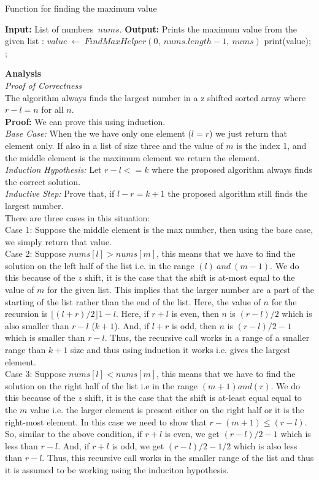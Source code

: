 \documentclass{article}
\begin{document}
\begin{algorithm}
\caption{Function for finding the maximum value}
\label{alg:maxfind}
\begin{algorithmic}[1]
\State \textbf{Input:} List of numbers\ $nums$.
\State \textbf{Output:} Prints the maximum value from the given list
:
\State $value\ \leftarrow\ FindMaxHelper(0,\ nums.length-1,\ nums)$
\State print(value);
\State \Return;
\EndFunction
\end{algorithmic}
\end{algorithm}

\textbf{Analysis}\\
\textit{Proof of Correctness}\\
The algorithm always finds the largest number in a z shifted sorted array where $r-l=n$ for all $n$.\\
\textbf{Proof:} We can prove this using induction. \\
\textit{Base Case: } When the we have only one element ($l=r$) we just return that element only. If also in a list of size three and the value of $m$ is the index 1, and the middle element is the maximum element we return the element. \\
\textit{Induction Hypothesis: } Let $r-l<=k$ where the proposed algorithm always finds the correct solution.\\
\textit{Inductive Step: } Prove that, if $l-r=k+1$ the proposed algorithm still finds the largest number. \\
There are three cases in this situation:\\
Case 1: Suppose the middle element is the max number, then using the base case, we simply return that value.\\
Case 2: Suppose $nums[l]>nums[m]$, this means that we have to find the solution on the left half of the list i.e. in the range $(l)\ and\ (m-1)$. We do this because of the $z$ shift, it is the case that the shift is at-most equal to the value of $m$ for the given list. This implies that the larger number are a part of the starting of the list rather than the end of the list. Here, the value of $n$ for the recursion is $\lfloor(l+r)/2\rfloor 1-l$. Here, if $r+l$ is even, then $n$ is $(r-l)/2$ which is also smaller than $r-l$ ($k+1$). And, if $l+r$ is odd, then $n$ is $(r-l)/2 -1$ which is smaller than $r-l$.  Thus, the recursive call works in a range of a smaller range than $k+1$ size and thus using induction it works i.e. gives the largest element.\\
Case 3: Suppose $nums[l]<nums[m]$, this means that we have to find the solution on the right half of the list i.e in the range $(m+1) and (r)$. We do this because of the $z$ shift, it is the case that the shift is at-least equal equal to the $m$ value i.e. the larger element is present either on the right half or it is the right-most element. In this case we need to show that $r-(m+1)\leqslant(r-l)$. So, similar to the above condition, if $r+l$ is even, we get $(r-l)/2-1$ which is less than $r-l$. And, if $r+l$ is odd, we get $(r-l)/2-1/2$ which is also less than $r-l$. Thus, this recursive call works in the smaller range of the list and thus it is assumed to be working using the induciton hypothesis. \\
\end{document}
